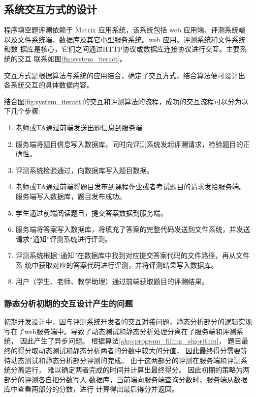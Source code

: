 \subsection{系统交互方式的设计}
\label{sub:系统交互方式设计}
程序填空题评测依赖于 Matrix 应用系统，该系统包括 web 应用端、评测系统端
以及文件系统端、数据库及其它小型服务系统。web 应用、评测系统和文件系统和数
据库是核心，它们之间通过HTTP协议或数据库连接协议进行交互。主要系统的交互
联系如图\ref{fig:system_iteract}。

交互方式是根据算法与系统的应用结合，确定了交互方式，结合算法便可设计出
各系统交互的具体数据内容。



结合图\ref{fig:system_iteract}的交互和评测算法的流程，成功的交互流程可以分为以下几个步骤:

\begin{enumerate}
  \item 老师或TA通过前端发送出题信息到服务端
  \item 服务端将题目信息写入数据库，同时向评测系统发起评测请求，检验题目的正确性。
  \item 评测系统检验通过，向数据库写入题目数据。
  \item 老师或TA通过前端将题目发布到课程作业或者考试题目的请求发给服务端。
  服务端写入数据库，题目发布成功。
  \item 学生通过前端阅读题目，提交答案数据到服务端。
  \item 服务端将答案写入数据库，将填充了答案的完整代码发送到文件系统，并发送
  请求“通知”评测系统进行评测。
  \item 评测系统根据“通知”在数据库中找到对应提交答案代码的文件路径，再从文件系
  统中获取对应的答案代码进行评测，并将评测结果写入数据库。
  \item 用户（学生、老师、教学助理）通过前端获取题目的评测结果。
\end{enumerate}

\subsubsection{静态分析初期的交互设计产生的问题}
初期开发设计中，因与评测系统开发者的交互对接问题，静态分析部分的逻辑实现
写在了web服务端中。导致了动态测试和静态分析处理分离在了服务端和评测系统，
因此产生了异步问题。
根据算法\ref{algo:program_filling_algorithm}，
题目最终的得分取动态测试和静态分析两者的分数中较大的分值，
因此最终得分需要等待动态测试和静态分析部分评测的完成。
由于这两部分的评测在服务端和评测系统分离运行，
难以确定两者完成的时间并计算出最终得分。
因此初期的策略为两部分的评测各自把分数写入
数据库，当前端向服务端查询分数时，服务端从数据库中查看两部分的分数，进行
计算得出最后得分并返回。

